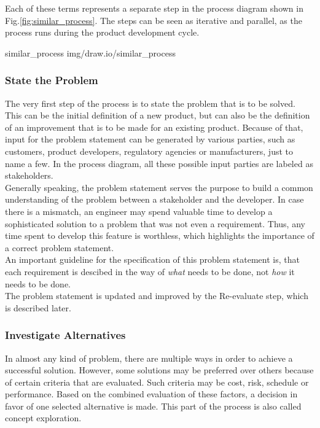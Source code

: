 Each of these terms represents a separate step in the process diagram shown in Fig.\ref{fig:similar_process}.
The steps can be seen as iterative and parallel, as the process runs during the product development cycle.

 {similar_process} {img/draw.io/similar_process}

\subsubsection{State the Problem}

The very first step of the process is to state the problem that is to be solved.
This can be the initial definition of a new product, but can also be the definition of an improvement that is to be made for an existing product.
Because of that, input for the problem statement can be generated by various parties, such as customers, product developers, regulatory agencies or manufacturers, just to name a few.
In the process diagram, all these possible input parties are labeled as stakeholders.\\

Generally speaking, the problem statement serves the purpose to build a common understanding of the problem between a stakeholder and the developer.
In case there is a mismatch, an engineer may spend valuable time to develop a sophisticated solution to a problem that was not even a requirement.
Thus, any time spent to develop this feature is worthless, which highlights the importance of a correct problem statement.\\

An important guideline for the specification of this problem statement is, that each requirement is descibed in the way of \textit{what} needs to be done, not \textit{how} it needs to be done.\\

The problem statement is updated and improved by the Re-evaluate step, which is described later.

\subsubsection{Investigate Alternatives}

In almost any kind of problem, there are multiple ways in order to achieve a successful solution.
However, some solutions may be preferred over others because of certain criteria that are evaluated.
Such criteria may be cost, risk, schedule or performance.
Based on the combined evaluation of these factors, a decision in favor of one selected alternative is made.
This part of the process is also called concept exploration.\\

